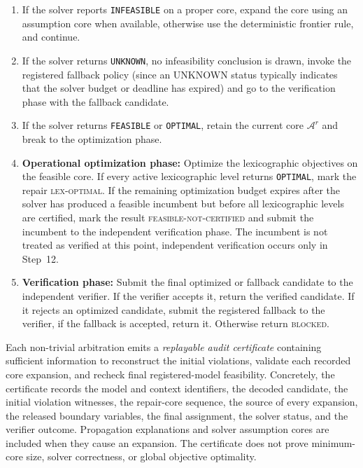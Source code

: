 \documentclass[pdflatex,sn-mathphys-num,iicol,oneside]{sn-jnl}
\newenvironment{algsteps}
  {\begin{enumerate}[
      leftmargin=1.8em,
      itemsep=1pt,
      parsep=0pt,
      topsep=2pt,
      label=\arabic*:
    ]}
  {\end{enumerate}}
\begin{document}
\begin{algorithm}[H]
\begin{algsteps}
\item If the solver reports \texttt{INFEASIBLE} on a proper core, expand the core using an assumption core when available, otherwise use the deterministic frontier rule, and continue.

\item If the solver returns \texttt{UNKNOWN}, no infeasibility conclusion is drawn, invoke the registered fallback policy (since an UNKNOWN status typically indicates that the solver budget or deadline has expired) and go to the verification phase with the fallback candidate.

\item If the solver returns \texttt{FEASIBLE} or \texttt{OPTIMAL}, retain the current core $\mathcal{A}^{r}$ and break to the optimization phase.

\item \textbf{Operational optimization phase:} Optimize the lexicographic objectives on the feasible core. If every active lexicographic level returns \texttt{OPTIMAL}, mark the repair \textsc{lex-optimal}. If the remaining optimization budget expires after the solver has produced a feasible incumbent but before all lexicographic levels are certified, mark the result \textsc{feasible-not-certified} and submit the incumbent to the independent verification phase. The incumbent is not treated as verified at this point, independent verification occurs only in Step~12.

\item \textbf{Verification phase:} Submit the final optimized or fallback candidate to the independent verifier. If the verifier accepts it, return the verified candidate. If it rejects an optimized candidate, submit the registered fallback to the verifier, if the fallback is accepted, return it. Otherwise return \textsc{blocked}.

\end{algsteps}
\end{algorithm}

Each non-trivial arbitration emits a \emph{replayable audit
certificate} containing sufficient information to reconstruct the
initial violations, validate each recorded core expansion, and
recheck final registered-model feasibility. Concretely, the
certificate records the model and context identifiers, the decoded
candidate, the initial violation witnesses, the repair-core sequence,
the source of every expansion, the released boundary variables, the
final assignment, the solver status, and the verifier outcome.
Propagation explanations and solver assumption cores are included
when they cause an expansion. The certificate does not prove
minimum-core size, solver correctness, or global objective
optimality.
\end{document}
